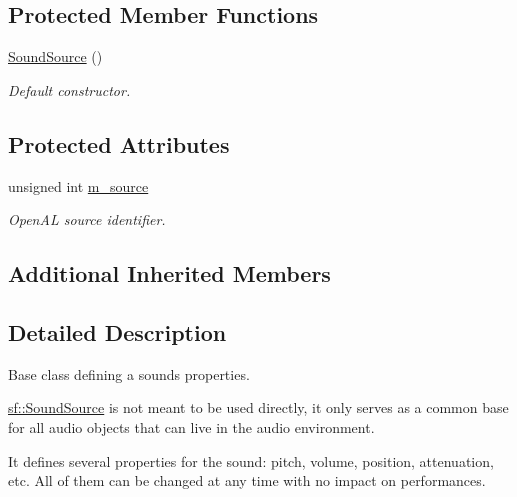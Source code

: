 \subsection*{Protected Member Functions}
\begin{DoxyCompactItemize}
\item 
\mbox{\hyperlink{classsf_1_1_sound_source_aefa4bd4460f387d81a0637d293979436}{Sound\+Source}} ()
\begin{DoxyCompactList}\small\item\em Default constructor. \end{DoxyCompactList}\end{DoxyCompactItemize}
\subsection*{Protected Attributes}
\begin{DoxyCompactItemize}
\item 
\mbox{\label{classsf_1_1_sound_source_a0223cef4b1c587e6e1e17b4c92c4479c}} 
unsigned int \mbox{\hyperlink{classsf_1_1_sound_source_a0223cef4b1c587e6e1e17b4c92c4479c}{m\+\_\+source}}
\begin{DoxyCompactList}\small\item\em Open\+AL source identifier. \end{DoxyCompactList}\end{DoxyCompactItemize}
\subsection*{Additional Inherited Members}


\subsection{Detailed Description}
Base class defining a sound\textquotesingle{}s properties. 

\begin{DoxyVerb}\end{DoxyVerb}


\mbox{\hyperlink{classsf_1_1_sound_source}{sf\+::\+Sound\+Source}} is not meant to be used directly, it only serves as a common base for all audio objects that can live in the audio environment.

It defines several properties for the sound\+: pitch, volume, position, attenuation, etc. All of them can be changed at any time with no impact on performances.

